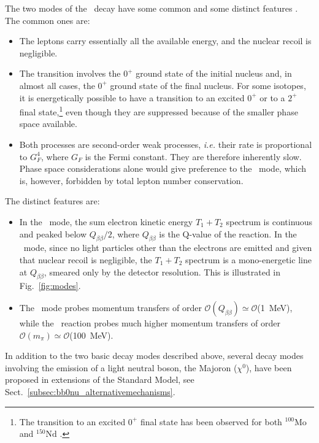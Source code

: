 The two modes of the \bb\ decay have some common and some distinct features \cite{Vogel:2008sx}. The common ones are:
\begin{itemize}
    \item The leptons carry essentially all the available energy, and the nuclear recoil is negligible.
    \item The transition involves the $0^+$ ground state of the initial nucleus and, in almost all cases, the $0^+$ ground state of the final nucleus. For some isotopes, it is energetically possible to have a transition to an excited $0^+$ or to a $2^+$ final state,\footnote{The transition to an excited $0^+$ final state has been observed for both $^{100}\text{Mo}$ \cite{Barabash:1995fn,Barabash:1999dp,Kidd:2009ai,NEMO:2006smm,Belli:2010zzc,NEMO-3:2014pkc} and $^{150}\text{Nd}$ \cite{Barabash:2009wy,Kidd:2014hra,Polischuk:2021bwl}.} even though they are suppressed because of the smaller phase space available.
    \item Both processes are second-order weak processes, \emph{i.e.} their rate is proportional to $G_F^4$, where $G_F$ is the Fermi constant. They are therefore inherently slow. Phase space considerations alone would give preference to the \bbonu\ mode, which is, however, forbidden by total lepton number conservation. 
\end{itemize}

The distinct features are:
\begin{itemize}
    \item In the \bbtnu\ mode, the sum electron kinetic energy $T_1+T_2$ spectrum is continuous and peaked below $Q_{\beta\beta}/2$, where $Q_{\beta\beta}$ is the Q-value of the reaction. In the \bbonu\ mode, since no light particles other than the electrons are emitted and given that nuclear recoil is negligible, the $T_1+T_2$ spectrum is a mono-energetic line at $Q_{\beta\beta}$, smeared only by the detector resolution. This is illustrated in Fig.~\ref{fig:modes}.
    \item The \bbtnu\ mode probes momentum transfers of order $\mathcal{O}(Q_{\beta\beta})\simeq \mathcal{O}$(1~MeV), while the \bbonu\ reaction probes much higher momentum transfers of order $\mathcal{O}(m_{\pi})\simeq \mathcal{O}$(100~MeV).
\end{itemize}

In addition to the two basic decay modes described above, several decay modes involving the emission of a light neutral boson, the Majoron ($\chi^{0}$), have been proposed in extensions of the Standard Model, see Sect.~\ref{subsec:bb0nu_alternativemechanisms}.


